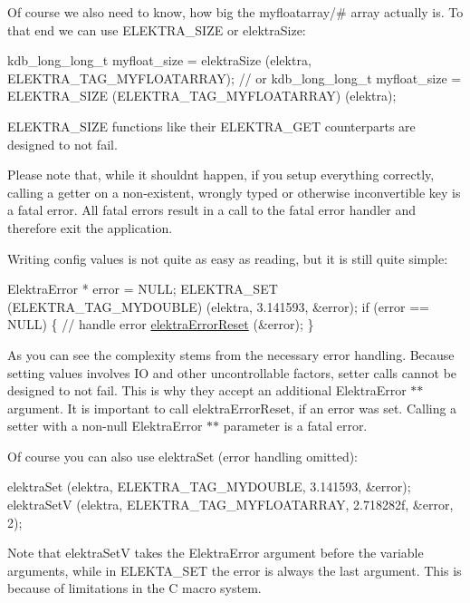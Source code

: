 Of course we also need to know, how big the {\ttfamily myfloatarray/\#} array actually is. To that end we can use {\ttfamily E\+L\+E\+K\+T\+R\+A\+\_\+\+S\+I\+ZE} or {\ttfamily elektra\+Size}\+:


\begin{DoxyCode}
kdb\_long\_long\_t myfloat\_size = elektraSize (elektra, ELEKTRA\_TAG\_MYFLOATARRAY);
\textcolor{comment}{// or}
kdb\_long\_long\_t myfloat\_size = ELEKTRA\_SIZE (ELEKTRA\_TAG\_MYFLOATARRAY) (elektra);
\end{DoxyCode}


{\ttfamily E\+L\+E\+K\+T\+R\+A\+\_\+\+S\+I\+ZE} functions like their {\ttfamily E\+L\+E\+K\+T\+R\+A\+\_\+\+G\+ET} counterparts are designed to not fail.

Please note that, while it shouldn\textquotesingle{}t happen, if you setup everything correctly, calling a getter on a non-\/existent, wrongly typed or otherwise inconvertible key is a fatal error. All fatal errors result in a call to the fatal error handler and therefore exit the application.

Writing config values is not quite as easy as reading, but it is still quite simple\+:


\begin{DoxyCode}
ElektraError * error = NULL;
ELEKTRA\_SET (ELEKTRA\_TAG\_MYDOUBLE) (elektra, 3.141593, &error);
\textcolor{keywordflow}{if} (error == NULL) \{
    \textcolor{comment}{// handle error}
    \hyperlink{group__highlevel_ga591f7ed4b57a341928bf7bb3d7adb693}{elektraErrorReset} (&error);
\}
\end{DoxyCode}


As you can see the complexity stems from the necessary error handling. Because setting values involves IO and other uncontrollable factors, setter calls cannot be designed to not fail. This is why they accept an additional {\ttfamily Elektra\+Error $\ast$$\ast$} argument. It is important to call {\ttfamily elektra\+Error\+Reset}, if an error was set. Calling a setter with a non-\/null {\ttfamily Elektra\+Error $\ast$$\ast$} parameter is a fatal error.

Of course you can also use {\ttfamily elektra\+Set} (error handling omitted)\+:


\begin{DoxyCode}
elektraSet (elektra, ELEKTRA\_TAG\_MYDOUBLE, 3.141593, &error);
elektraSetV (elektra, ELEKTRA\_TAG\_MYFLOATARRAY, 2.718282f, &error, 2);
\end{DoxyCode}


Note that {\ttfamily elektra\+SetV} takes the {\ttfamily Elektra\+Error} argument before the variable arguments, while in {\ttfamily E\+L\+E\+K\+T\+A\+\_\+\+S\+ET} the error is always the last argument. This is because of limitations in the C macro system.

